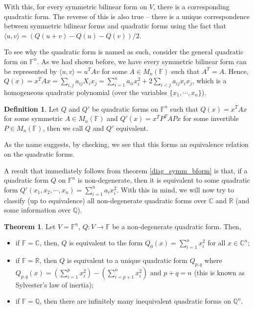 \documentclass[
]{article}
\theoremstyle{definition}
\newtheorem{theorem}{Theorem}
\theoremstyle{definition}
\newtheorem{definition}{Definition}[section]
\begin{document}
With this, for every symmetric bilinear form on \(V\), there is a
corresponding quadratic form. The reverse of this is also true -- there
is a unique correspondence between symmetric bilinear forms and
quadratic forms using the fact that
\(\langle u, v \rangle = (Q(u + v) - Q(u) - Q(v)) / 2\).

To see why the quadratic form is named as such, consider the general
quadratic form on \(\mathbb{F}^n\). As we had shown before, we have
every symmetric bilinear form can be represented by
\(\langle u, v \rangle = u^T A v\) for some \(A \in M_n(\mathbb{F})\)
such that \(A^T = A\). Hence,
\(Q(x) = x^T A x = \sum_{i, j} a_{ij} X_i x_j = \sum_{i = 1}^n a_{ii} x_i^2 + 2\sum_{i < j} a_{ij} x_i x_j\),
which is a homogeneous quadratic polynomial (over the variables
\(\{x_1, \cdots, x_n\}\)).

\begin{definition}
  Let \(Q\) and \(Q'\) be quadratic forms on \(\mathbb{F}^n\) such that 
  \(Q(x) = x^T A x\) for some symmetric \(A \in M_n(\mathbb{F})\) and 
  \(Q'(x) = x^T P^TAP x\) for some invertible \(P \in M_n(\mathbb{F})\), then 
  we call \(Q\) and \(Q'\) equivalent.
\end{definition}

As the name suggests, by checking, we see that this forms an equivalence
relation on the quadratic forms.

A result that immediately follows from theorem \ref{diag_symm_bform} is
that, if a quadratic form \(Q\) on \(\mathbb{F}^n\) is non-degenerate,
then it is equivalent to some quadratic form
\(Q'(x_1, x_2, \cdots, x_n) = \sum_{i = 1}^n a_i x_i^2\). With this in
mind, we will now try to classify (up to equivalence) all non-degenerate
quadratic forms over \(\mathbb{C}\) and \(\mathbb{R}\) (and some
information over \(\mathbb{Q}\)).

\begin{theorem}
  Let \(V = \mathbb{F}^n\), \(Q : V \to \mathbb{F}\) be a non-degenerate quadratic 
  form. Then, 
  \begin{itemize}
    \item if \(\mathbb{F} = \mathbb{C}\), then, \(Q\) is equivalent to the form 
      \(Q_0(x) = \sum_{i = 1}^n x_i^2\) for all \(x \in \mathbb{C}^n\);
    \item if \(\mathbb{F} = \mathbb{R}\), then \(Q\) is equivalent to a unique 
      quadratic form \(Q_{p, q}\) where \(Q_{p, q}(x) = (\sum_{i = 1}^p x_i^2) - 
      (\sum_{i = p + 1}^n x_i^2)\) and \(p + q = n\) (this is known as 
      Sylvester's law of inertia);
    \item if \(\mathbb{F} = \mathbb{Q}\), then there are infinitely many inequivalent 
      quadratic forms on \(\mathbb{Q}^n\).
  \end{itemize}
\end{theorem}
\proof
\end{document}

